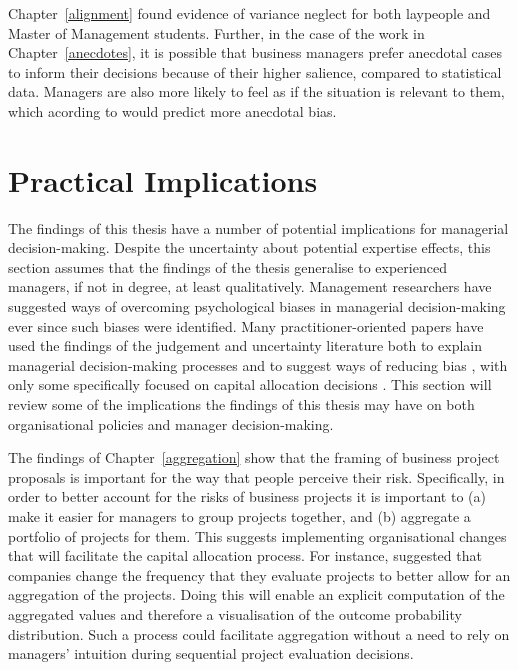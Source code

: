 \documentclass[a4paper, nobind]{templates/ociamthesis}
\theoremstyle{definition}
\theoremstyle{definition}
\theoremstyle{definition}
\theoremstyle{definition}
\theoremstyle{remark}
\begin{document}
Chapter~\ref{alignment} found evidence of variance neglect for both laypeople
and Master of Management students. Further, in the case of the work in
Chapter~\ref{anecdotes}, it is possible that business managers prefer anecdotal
cases to inform their decisions because of their higher salience, compared to
statistical data. Managers are also more likely to feel as if the situation is
relevant to them, which acording to \textcite{freling2020} would predict more anecdotal
bias.

\hypertarget{practical-implications}{%
\section{Practical Implications}\label{practical-implications}}

The findings of this thesis have a number of potential implications for
managerial decision-making. Despite the uncertainty about potential expertise
effects, this section assumes that the findings of the thesis generalise to
experienced managers, if not in degree, at least qualitatively. Management
researchers have suggested ways of overcoming psychological biases in managerial
decision-making ever since such biases were identified. Many
practitioner-oriented papers have used the findings of the judgement and
uncertainty literature both to explain managerial decision-making processes and
to suggest ways of reducing bias \autocite{lovallo2014,koller2012,hall2012,courtney1997,courtney2013,sibony2017}, with only some specifically focused
on capital allocation decisions \autocite{birshan2013}. This section will review some of
the implications the findings of this thesis may have on both organisational
policies and manager decision-making.

The findings of Chapter~\ref{aggregation} show that the framing of business
project proposals is important for the way that people perceive their risk.
Specifically, in order to better account for the risks of business projects it
is important to (a) make it easier for managers to group projects together, and
(b) aggregate a portfolio of projects for them. This suggests implementing
organisational changes that will facilitate the capital allocation process. For
instance, \textcite{lovallo2020} suggested that companies change the frequency that they
evaluate projects to better allow for an aggregation of the projects. Doing this
will enable an explicit computation of the aggregated values and therefore a
visualisation of the outcome probability distribution. Such a process could
facilitate aggregation without a need to rely on managers' intuition during
sequential project evaluation decisions.
\end{document}

